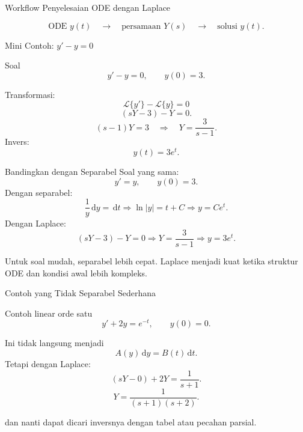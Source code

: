 \documentclass[aspectratio=169,11pt]{beamer}
\newcommand{\lap}[1]{\mathcal{L}\{#1\}}
\newcommand{\dd}{\,\mathrm{d}}
\begin{document}
\begin{frame}{Workflow Penyelesaian ODE dengan Laplace}
\begin{center}
\end{center}
\[
\text{ODE } y(t) \quad \longrightarrow \quad \text{persamaan } Y(s) \quad \longrightarrow \quad \text{solusi } y(t).
\]
\end{frame}

\begin{frame}{Mini Contoh: $y'-y=0$}
\begin{exampleblock}{Soal}
\[
 y'-y=0, \qquad y(0)=3.
\]
\end{exampleblock}
Transformasi:
\[
\lap{y'}-\lap{y}=0
\]
\[
(sY-3)-Y=0.
\]
\[
(s-1)Y=3
\quad \Rightarrow \quad
Y=\frac{3}{s-1}.
\]
Invers:
\[
\boxed{y(t)=3e^t.}
\]
\end{frame}

\begin{frame}{Bandingkan dengan Separabel}
Soal yang sama:
\[
 y'=y, \qquad y(0)=3.
\]
Dengan separabel:
\[
\frac{1}{y}\dd y=\dd t
\Rightarrow \ln|y|=t+C
\Rightarrow y=Ce^t.
\]
Dengan Laplace:
\[
(sY-3)-Y=0 \Rightarrow Y=\frac{3}{s-1}\Rightarrow y=3e^t.
\]
\begin{center}
Untuk soal mudah, separabel lebih cepat. Laplace menjadi kuat ketika struktur ODE dan kondisi awal lebih kompleks.
\end{center}
\end{frame}

\begin{frame}{Contoh yang Tidak Separabel Sederhana}
\begin{block}{Contoh linear orde satu}
\[
 y'+2y=e^{-t}, \qquad y(0)=0.
\]
\end{block}
Ini tidak langsung menjadi
\[
 A(y)\dd y=B(t)\dd t.
\]
Tetapi dengan Laplace:
\[
(sY-0)+2Y=\frac{1}{s+1}.
\]
\[
Y=\frac{1}{(s+1)(s+2)}.
\]

dan nanti dapat dicari inversnya dengan tabel atau pecahan parsial.
\end{frame}
\end{document}
